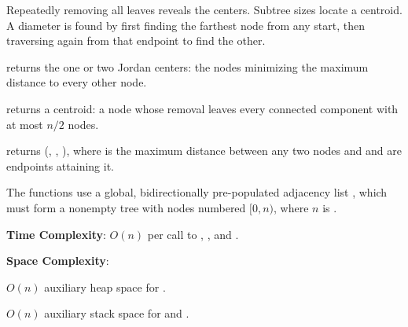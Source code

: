 Repeatedly removing all leaves reveals the centers. Subtree sizes locate a centroid. A diameter is found by first finding the farthest node from any start, then traversing again from that endpoint to find the other.

\begin{compactitem}
  \item {} returns the one or two Jordan centers: the nodes minimizing the maximum distance to every other node.
  \item {} returns a centroid: a node whose removal leaves every connected component with at most $n / 2$ nodes.
  \item {} returns (, , ), where  is the maximum distance between any two nodes and  and  are endpoints attaining it.
\end{compactitem}

The functions use a global, bidirectionally pre-populated adjacency list , which must form a nonempty tree with nodes numbered $[0, n)$, where $n$ is .

\textbf{Time Complexity}: $O(n)$ per call to , , and .

\textbf{Space Complexity}:
\begin{compactitem}
  \item $O(n)$ auxiliary heap space for .
  \item $O(n)$ auxiliary stack space for  and .
\end{compactitem}

